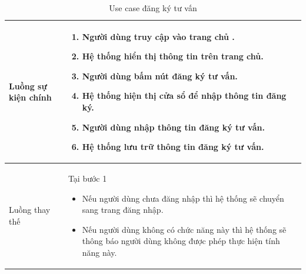 \documentclass[12pt,a4paper]{article}
\begin{document}
\begin{table}[H]
\begin{tabular}{|p{3.5cm}|p{11.5cm}|c|}
            Luồng sự kiện chính & \vspace{-.8cm}\begin{enumerate}
                                                    \item Người dùng truy cập vào trang chủ .
                                                    \item Hệ thống hiển thị thông tin trên trang chủ.
                                                    \item Người dùng bấm nút đăng ký tư vấn.
                                                    \item Hệ thống hiện thị cửa sổ để nhập thông tin đăng ký.
                                                    \item Người dùng nhập thông tin đăng ký tư vấn.
                                                    \item Hệ thống lưu trữ thông tin đăng ký tư vấn.
            \end{enumerate}
            \\
            \hline
            Luồng thay thế & Tại bước 1\newline
            \vspace{-.8cm}\begin{itemize}
                              \item Nếu người dùng chưa đăng nhập thì hệ thống sẽ chuyển sang trang đăng nhập.
                              \item Nếu người dùng không có chức năng này thì hệ thống sẽ thông báo người dùng không được phép thực hiện tính năng này.
            \end{itemize}

            \\ \hline
        \end{tabular}
        \caption{Use case đăng ký tư vấn}

    \end{table}

\end{document}
